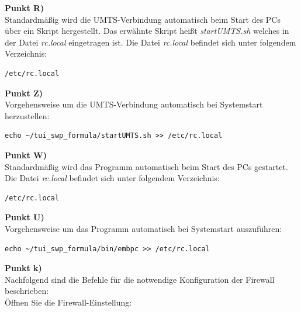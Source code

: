 \documentclass[fontsize = 12pt, paper = a4]{scrreprt}
\begin{document}
\textbf{Punkt R)} \\

Standardmäßig wird die UMTS-Verbindung automatisch beim Start des PCs über ein Skript hergestellt. Das erwähnte Skript heißt \textit{startUMTS.sh} welches in der Datei  \textit{rc.local } eingetragen ist. Die Datei \textit{rc.local} befindet sich unter folgendem Verzeichnis:

\vspace*{4mm}
\begin{lstlisting}[frame=single]
/etc/rc.local
\end{lstlisting} 
\vspace*{-2mm}

\textbf{Punkt Z)} \\

Vorgehensweise um die UMTS-Verbindung automatisch bei Systemstart herzustellen:

\vspace*{4mm}
\begin{lstlisting}[frame=single]
echo ~/tui_swp_formula/startUMTS.sh >> /etc/rc.local
\end{lstlisting} 
\vspace*{-2mm}

\textbf{Punkt W)} \\

Standardmäßig wird das Programm automatisch beim Start des PCs gestartet. Die Datei \textit{rc.local} befindet sich unter folgendem Verzeichnis:

\vspace*{4mm}
\begin{lstlisting}[frame=single]
/etc/rc.local
\end{lstlisting} 
\vspace*{-2mm}

\textbf{Punkt U)} \\

Vorgehensweise um das Programm automatisch bei Systemstart auszuführen:

\vspace*{4mm}
\begin{lstlisting}[frame=single]
echo ~/tui_swp_formula/bin/embpc >> /etc/rc.local
\end{lstlisting} 
\vspace*{-2mm}

\textbf{Punkt k)} \\

Nachfolgend sind die Befehle für die notwendige Konfiguration der Firewall beschrieben: \\
Öffnen Sie die Firewall-Einstellung:
\end{document}
